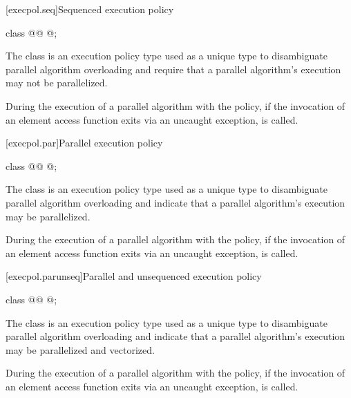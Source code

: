[execpol.seq]{Sequenced execution policy}

%
\begin{itemdecl}
class @@ { @\unspec@ };
\end{itemdecl}

\begin{itemdescr}
\pnum
The class  is an execution policy type used
as a unique type to disambiguate parallel algorithm overloading and require
that a parallel algorithm's execution may not be parallelized.

\pnum
During the execution of a parallel algorithm with
the  policy,
if the invocation of an element access function exits via an uncaught exception,
 is called.
\end{itemdescr}

[execpol.par]{Parallel execution policy}

%
\begin{itemdecl}
class @@ { @\unspec@ };
\end{itemdecl}

\begin{itemdescr}
\pnum
The class  is an execution policy type used as
a unique type to disambiguate parallel algorithm overloading and indicate that
a parallel algorithm's execution may be parallelized.

\pnum
During the execution of a parallel algorithm with
the  policy,
if the invocation of an element access function exits via an uncaught exception,
 is called.
\end{itemdescr}

[execpol.parunseq]{Parallel and unsequenced execution policy}

%
\begin{itemdecl}
class @@ { @\unspec@ };
\end{itemdecl}

\begin{itemdescr}
\pnum
The class  is an execution policy type
used as a unique type to disambiguate parallel algorithm overloading and
indicate that a parallel algorithm's execution may be parallelized and
vectorized.

\pnum
During the execution of a parallel algorithm with
the  policy,
if the invocation of an element access function exits via an uncaught exception,
 is called.
\end{itemdescr}

